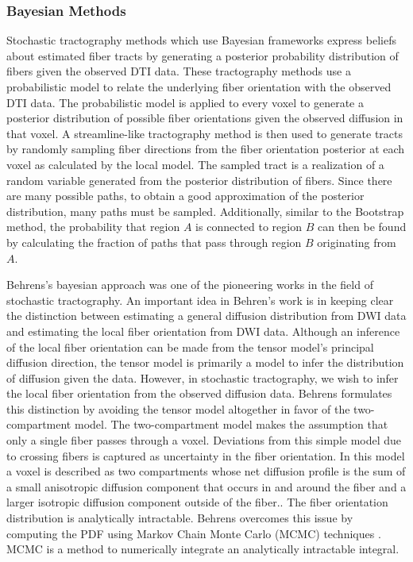 \subsubsection{Bayesian Methods}
Stochastic tractography methods which use Bayesian frameworks express beliefs about estimated fiber tracts by generating a posterior probability distribution of fibers given the observed DTI data.   These tractography methods use a probabilistic model to relate the underlying fiber orientation with the observed DTI data.  The probabilistic model is applied to every voxel to generate a posterior distribution of possible fiber orientations given the observed diffusion in that voxel.  A streamline-like tractography method is then used to generate tracts by randomly sampling fiber directions from the fiber orientation posterior at each voxel as calculated by the local model.  The sampled tract is a realization of a random variable generated from the posterior distribution of fibers.  Since there are many possible paths, to obtain a good approximation of the posterior distribution, many paths must be sampled.  Additionally, similar to the Bootstrap method, the probability that region $A$ is connected to region $B$ can then be found by calculating the fraction of paths that pass through region $B$ originating from $A$.

Behrens's bayesian approach was one of the pioneering works in the field of stochastic tractography\cite{behrensMRM03}. An important idea in Behren's work is in keeping clear the distinction between estimating a general diffusion distribution from DWI data and estimating the local fiber orientation from DWI data.  Although an inference of the local fiber orientation can be made from the tensor model's principal diffusion direction, the tensor model is primarily a model to infer the distribution of diffusion given the data.  However, in stochastic tractography, we wish to infer the local fiber orientation from the observed diffusion data.  Behrens formulates this distinction by avoiding the tensor model altogether in favor of the two-compartment model. The two-compartment model makes the assumption that only a single fiber passes through a voxel.  Deviations from this simple model due to crossing fibers is captured as uncertainty in the fiber orientation.  In this model a voxel is described as two compartments whose net diffusion profile is the sum of a small anisotropic diffusion component that occurs in and around the fiber and a larger isotropic diffusion component outside of the fiber.\cite{behrensMRM03}.  The fiber orientation distribution is analytically intractable.  Behrens overcomes this issue by computing the PDF using Markov Chain Monte Carlo (MCMC) techniques \cite{andrieu03introduction}.  MCMC is a method to numerically integrate an analytically intractable integral.  
